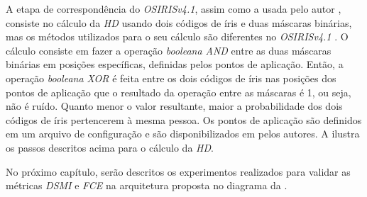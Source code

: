 
\par A etapa de correspondência do \textit{OSIRISv4.1}, assim como a usada pelo autor \cite{daugman2004}, consiste no cálculo da \textit{\acrshort{HD}} usando dois códigos de íris e duas máscaras binárias, mas os métodos utilizados para o seu cálculo são diferentes no \textit{OSIRISv4.1} \cite{osirisv41_doc}. O cálculo consiste em fazer a operação \textit{booleana AND} entre as duas máscaras binárias em posições específicas, definidas pelos pontos de aplicação. Então, a operação \textit{booleana XOR} é feita entre os dois códigos de íris nas posições dos pontos de aplicação que o resultado da operação entre as máscaras é 1, ou seja, não é ruído. Quanto menor o valor resultante, maior a probabilidade dos dois códigos de íris pertencerem à mesma pessoa. Os pontos de aplicação são definidos em um arquivo de configuração e são disponibilizados em \cite{osirisv41} pelos autores. A  ilustra os passos descritos acima para o cálculo da \textit{\acrshort{HD}}.

\par No próximo capítulo, serão descritos os experimentos realizados para validar as métricas \textit{\acrshort{DSMI}} e \textit{\acrshort{FCE}} na arquitetura proposta no diagrama da .


